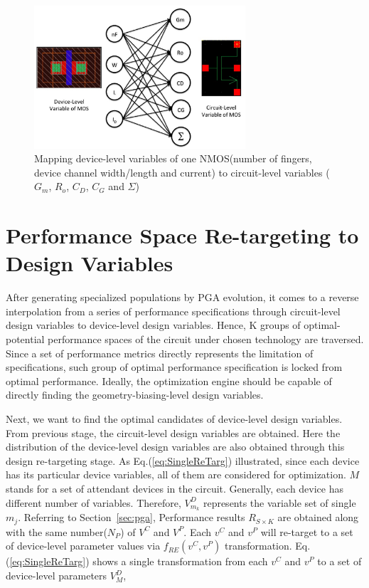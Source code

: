     \begin{figure}[t]
      \centering
      \centerline{
        \includegraphics[width=0.7\textwidth]{Fig/DeviceFit.eps}
      }
      \caption{Mapping device-level variables of one NMOS(number of fingers, device channel width/length and current) to circuit-level variables ($G_m$, $R_o$, $C_D$, $C_G$ and $\Sigma$) } 
      \label{fig:DeviceFit}
    \end{figure}

  \label{sec:GPEF}

  \section{Performance Space Re-targeting to Design Variables}\label{sec:reTarg}
    
    After generating specialized populations by PGA evolution, it comes to a reverse interpolation from a series of performance specifications through circuit-level design variables to device-level design variables. Hence, K groups of optimal-potential performance spaces of the circuit under chosen technology are traversed. Since a set of performance metrics directly represents the limitation of specifications, such group of optimal performance specification is locked from optimal performance. Ideally, the optimization engine should be capable of directly finding the geometry-biasing-level design variables. 

    Next, we want to find the optimal candidates of device-level design variables. From previous stage, the circuit-level design variables are obtained. Here the distribution of the device-level design variables are also obtained through this design re-targeting stage. As Eq.(\ref{eq:SingleReTarg}) illustrated, since each device has its particular device variables, all of them are considered for optimization. $M$ stands for a set of attendant devices in the circuit. Generally, each device has different number of variables. Therefore, $V^D_{m_k}$ represents the variable set of single $m_j$. Referring to Section~\ref{sec:pga}, Performance results $R_{S \times K}$ are obtained along with the same number($N_P$) of $V^C$ and $V^P$. Each $v^C$ and $v^P$ will re-target to a set of device-level parameter values via $f_{RE}(v^C, v^P)$ transformation. Eq.(\ref{eq:SingleReTarg}) shows a single transformation from each $v^C$ and $v^P$ to a set of device-level parameters $V^D_M$,


